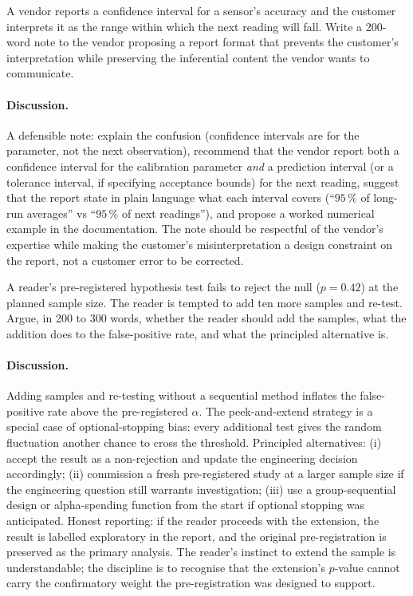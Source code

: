 \begin{exercise}
A vendor reports a confidence interval for a sensor's accuracy and
the customer interprets it as the range within which the next
reading will fall. Write a 200-word note to the vendor proposing a
report format that prevents the customer's interpretation while
preserving the inferential content the vendor wants to communicate.
\end{exercise}

\paragraph{Discussion.}
A defensible note: explain the confusion (confidence intervals are
for the parameter, not the next observation), recommend that the
vendor report both a confidence interval for the calibration
parameter \emph{and} a prediction interval (or a tolerance
interval, if specifying acceptance bounds) for the next reading,
suggest that the report state in plain language what each interval
covers (``$95\,\%$ of long-run averages'' vs ``$95\,\%$ of next
readings''), and propose a worked numerical example in the
documentation. The note should be respectful of the vendor's
expertise while making the customer's misinterpretation a design
constraint on the report, not a customer error to be corrected.

\begin{exercise}
A reader's pre-registered hypothesis test fails to reject the null
($p = 0.42$) at the planned sample size. The reader is tempted to
add ten more samples and re-test. Argue, in 200 to 300 words,
whether the reader should add the samples, what the addition does
to the false-positive rate, and what the principled alternative is.
\end{exercise}

\paragraph{Discussion.}
Adding samples and re-testing without a sequential method inflates
the false-positive rate above the pre-registered $\alpha$. The
peek-and-extend strategy is a special case of optional-stopping
bias: every additional test gives the random fluctuation another
chance to cross the threshold. Principled alternatives: (i) accept
the result as a non-rejection and update the engineering decision
accordingly; (ii) commission a fresh pre-registered study at a
larger sample size if the engineering question still warrants
investigation; (iii) use a group-sequential design or
alpha-spending function from the start if optional stopping was
anticipated. Honest reporting: if the reader proceeds with the
extension, the result is labelled exploratory in the report, and
the original pre-registration is preserved as the primary
analysis. The reader's instinct to extend the sample is
understandable; the discipline is to recognise that the
extension's $p$-value cannot carry the confirmatory weight the
pre-registration was designed to support.
